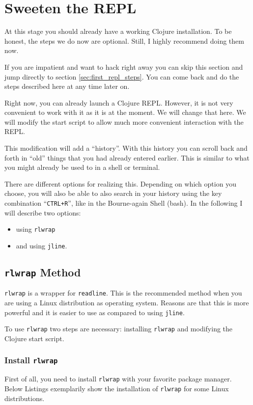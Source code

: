 \chapter{Sweeten the REPL}
\label{sec:improve_repl}
At this stage you should already have a working Clojure installation.
To be honest, the steps we do now are optional.
Still, I highly recommend doing them now.

If you are impatient and want to hack right away you can skip this section and jump directly to section \vref{sec:first_repl_steps}.
You can come back and do the steps described here at any time later on.

Right now, you can already launch a Clojure REPL.
However, it is not very convenient to work with it as it is at the moment.
We will change that here.
We will modify the start script to allow much more convenient interaction with the REPL.

This modification will add a ``history''.
With this history you can scroll back and forth in ``old'' things that you had already entered earlier.
This is similar to what you might already be used to in a shell or terminal.

There are different options for realizing this.
Depending on which option you choose, you will also be able to also search in your history using the key combination ``\texttt{CTRL+R}'', like in the Bourne-again Shell (bash).
In the following I will describe two options:
\begin{itemize}
  \item using \texttt{rlwrap}
  \item and using \texttt{jline}.
\end{itemize}

\section{\texttt{rlwrap} Method}
\label{sec:rlwrap}
\texttt{rlwrap} is a wrapper for \texttt{readline}.
This is the recommended method when you are using a Linux distribution as operating system.
Reasons are that this is more powerful and it is easier to use as compared to using \texttt{jline}.

To use \texttt{rlwrap} two steps are necessary:
installing \texttt{rlwrap} and modifying the Clojure start script.

\subsection{Install \texttt{rlwrap}}
First of all, you need to install \texttt{rlwrap} with your favorite package manager.
Below Listings  exemplarily show the installation of \texttt{rlwrap} for some Linux distributions.

